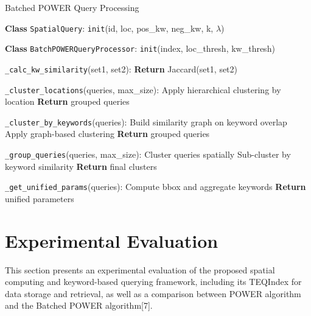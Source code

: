 \documentclass[conference]{IEEEtran}
\begin{document}
    \begin{algorithm}[htbp]
    \caption{Batched POWER Query Processing}
    \label{alg:batch_power}
    \begin{algorithmic}[1]
    \small  %
    
    \State \textbf{Class} \texttt{SpatialQuery}:
    \Indent
        \State \texttt{init}(id, loc, pos\_kw, neg\_kw, k, \(\lambda\))
    \EndIndent
    
    \State \textbf{Class} \texttt{BatchPOWERQueryProcessor}:
    \Indent
        \State \texttt{init}(index, loc\_thresh, kw\_thresh)
            
        \State \texttt{\_calc\_kw\_similarity}(set1, set2):
        \Indent
            \State \textbf{Return} Jaccard(set1, set2)
        \EndIndent
        
        \State \texttt{\_cluster\_locations}(queries, max\_size):
        \Indent
            \State Apply hierarchical clustering by location
            \State \textbf{Return} grouped queries
        \EndIndent
        
        \State \texttt{\_cluster\_by\_keywords}(queries):
        \Indent
            \State Build similarity graph on keyword overlap
            \State Apply graph-based clustering
            \State \textbf{Return} grouped queries
        \EndIndent
        
        \State \texttt{\_group\_queries}(queries, max\_size):
        \Indent
            \State Cluster queries spatially
            \State Sub-cluster by keyword similarity
            \State \textbf{Return} final clusters
        \EndIndent
        
        \State \texttt{\_get\_unified\_params}(queries):
        \Indent
            \State Compute bbox and aggregate keywords
            \State \textbf{Return} unified parameters
        \EndIndent
    \EndIndent
    
    \end{algorithmic}
    \end{algorithm}
    
\section{Experimental Evaluation}
This section presents an experimental evaluation of the proposed spatial computing and keyword-based querying framework, including its TEQIndex for data storage and retrieval, as well as a comparison between POWER algorithm and the Batched POWER algorithm[7].\\
\end{document}
